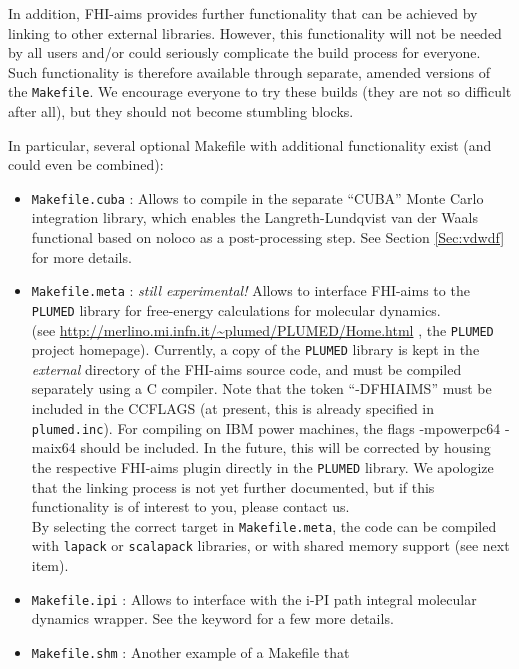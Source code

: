 In addition, FHI-aims provides further functionality that can be achieved by
linking to other external libraries. However, this functionality will not be
needed by all users and/or could seriously complicate the build process for
everyone. Such functionality is therefore available through separate, amended
versions of the \texttt{Makefile}. We encourage everyone to try these builds
(they are not so difficult after all), but they should not become stumbling
blocks. 

In particular, several optional Makefile with additional functionality
exist (and could even be combined):
\begin{itemize}
  \item \texttt{Makefile.cuba} : Allows to compile in the separate ``CUBA''
    Monte Carlo integration library, which enables the Langreth-Lundqvist van
    der Waals functional based on noloco as a post-processing step. See Section
    \ref{Sec:vdwdf} for more details.
  \item \texttt{Makefile.meta} : \emph{still experimental!} Allows to
    interface FHI-aims to the \texttt{PLUMED} library for free-energy
    calculations for molecular dynamics. \\ (see
    \url{http://merlino.mi.infn.it/\~plumed/PLUMED/Home.html} , the \texttt{PLUMED}
    project homepage). Currently, a copy of the \texttt{PLUMED} library is
    kept in the \emph{external} directory of the FHI-aims source code, and
    must be compiled separately using a C compiler. Note that
     the token ``-DFHIAIMS'' must be included in the CCFLAGS (at present, this is already specified in \texttt{plumed.inc}). 
     For compiling on IBM power machines, the flags -mpowerpc64 -maix64 should
    be included. In the future, this will be corrected by housing the
    respective FHI-aims plugin directly in the \texttt{PLUMED} library. We
    apologize that the linking process is not yet further documented,
    but if this functionality is of interest to you, please contact us.\\
    By selecting the correct target in \texttt{Makefile.meta}, the code can be compiled 
    with \texttt{lapack} or \texttt{scalapack} libraries, or with shared memory support (see next item).
  \item \texttt{Makefile.ipi} : Allows to interface with the i-PI path integral molecular dynamics wrapper\cite{CeriottiMoreMano_2013}.
    See the  keyword for a few more details.
  \item \texttt{Makefile.shm} : Another example of a Makefile that

\end{itemize}
